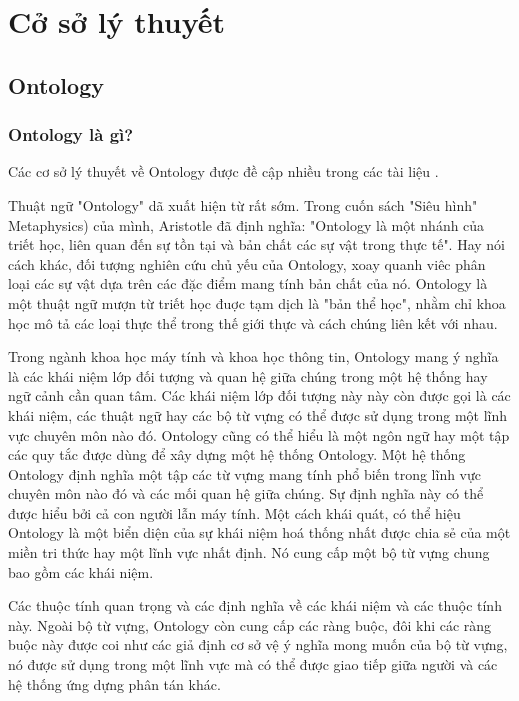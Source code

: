 \chapter{Cở sở lý thuyết}


\section{Ontology}
    \subsection{Ontology là gì?}
    
    
Các cơ sở lý thuyết về Ontology được đề cập nhiều trong các tài liệu \cite{mcguinness2004owl}\cite{maedche2001ontology}\cite{berners2001semantic}\cite{thanh2014ontology}\cite{kiem1997mang}.
    
   Thuật ngữ "Ontology" dã xuất hiện từ rất sớm. Trong cuốn sách "Siêu hình"
Metaphysics\cite{taylor1963metaphysics}) của mình, Aristotle đã định nghĩa: "Ontology là một nhánh của triết
học, liên quan đến sự tồn tại và bản chất các sự vật trong thực tế". Hay nói cách
khác, đối tượng nghiên cứu chủ yếu của Ontology, xoay quanh viêc phân loại các sự vật dựa trên các đặc điểm mang tính bản chất của nó. Ontology là một thuật ngữ
mượn từ triết học đuợc tạm dịch là "bản thể học", nhằm chỉ khoa học mô tả các loại
thực thể trong thế giới thực và cách chúng liên kết với nhau. 

Trong ngành khoa học máy tính và khoa học thông tin, Ontology mang ý nghĩa là các khái niệm lớp đối tượng và quan hệ giữa chúng trong một hệ thống hay ngữ cảnh cần quan tâm. Các khái niệm lớp đối tượng này này còn được gọi là các khái niệm, các thuật ngữ hay các bộ từ vựng có thể được sử dụng trong một
lĩnh vực chuyên môn nào đó. Ontology cũng có thể hiểu là một ngôn ngữ hay một tập các quy tắc được dùng để xây dựng một hệ thống Ontology. Một hệ thống
Ontology định nghĩa một tập các từ vựng mang tính phổ biến trong lĩnh vực chuyên môn nào đó và các mối quan hệ giữa chúng. Sự định nghĩa này có thể được hiểu
bởi cả con người lẫn máy tính. Một cách khái quát, có thể hiệu Ontology là một biển diện của sự khái niệm hoá thống nhất được chia sẻ của một miền tri thức hay
một lĩnh vực nhất định. Nó cung cấp một bộ từ vựng chung bao gồm các khái niệm.

Các thuộc tính quan trọng và các định nghĩa về các khái niệm và các thuộc tính này.
Ngoài bộ từ vựng, Ontology còn cung cấp các ràng buộc, đôi khi các ràng buộc này được coi như các giả định cơ sở vệ ý nghĩa mong muốn của bộ từ vựng, nó được sử dụng trong một lĩnh vực mà có thể được giao tiếp giữa người và các hệ thống ứng dựng phân tán khác.

